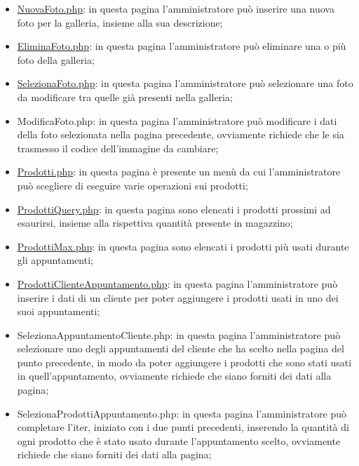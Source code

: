 {\begin{itemize}
		\item \href{http://tecweb2016.studenti.math.unipd.it/smarches/NuovaFoto.php}{NuovaFoto.php}: in questa pagina l'amministratore può inserire una nuova foto per la galleria, insieme alla sua descrizione;
		\item \href{http://tecweb2016.studenti.math.unipd.it/smarches/EliminaFoto.php}{EliminaFoto.php}: in questa pagina l'amministratore può eliminare una o più foto della galleria;
		\item \href{http://tecweb2016.studenti.math.unipd.it/smarches/SelezionaFoto.php}{SelezionaFoto.php}: in questa pagina l'amministratore può selezionare una foto da modificare tra quelle già presenti nella galleria;
		\item ModificaFoto.php: in questa pagina l'amministratore può modificare i dati della foto selezionata nella pagina precedente, ovviamente richiede che le sia trasmesso il codice dell'immagine da cambiare;
		\item \href{http://tecweb2016.studenti.math.unipd.it/smarches/Prodotti.php}{Prodotti.php}: in questa pagina è presente un menù da cui l'amministratore può scegliere di eseguire varie operazioni sui prodotti;
		\item \href{http://tecweb2016.studenti.math.unipd.it/smarches/ProdottiQuery.php}{ProdottiQuery.php}: in questa pagina sono elencati i prodotti prossimi ad esaurirsi, insieme alla rispettiva quantità presente in magazzino;
		\item \href{http://tecweb2016.studenti.math.unipd.it/smarches/ProdottiMax.php}{ProdottiMax.php}: in questa pagina sono elencati i prodotti più usati durante gli appuntamenti;
		\item \href{http://tecweb2016.studenti.math.unipd.it/smarches/ProdottiClienteAppuntamento.php}{ProdottiClienteAppuntamento.php}: in questa pagina l'amministratore può inserire i dati di un cliente per poter aggiungere i prodotti usati in uno dei suoi appuntamenti;
		\item SelezionaAppuntamentoCliente.php: in questa pagina l'amministratore può selezionare uno degli appuntamenti del cliente che ha scelto nella pagina del punto precedente, in modo da poter aggiungere i prodotti che sono stati usati in quell'appuntamento, ovviamente richiede che siano forniti dei dati alla pagina;
		\item SelezionaProdottiAppuntamento.php: in questa pagina l'amministratore può completare l'iter, iniziato con i due punti precedenti, inserendo la quantità di ogni prodotto che è stato usato durante l'appuntamento scelto, ovviamente richiede che siano forniti dei dati alla pagina;

\end{itemize}}
